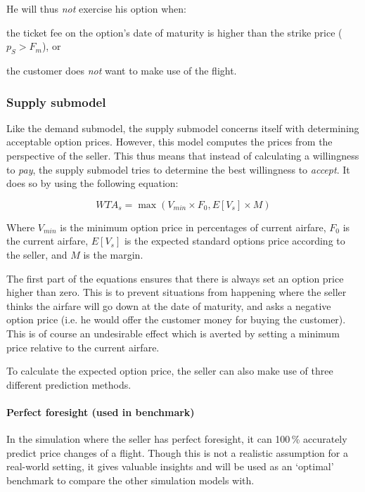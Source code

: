 He will thus \emph{not} exercise his option when:
\begin{compactitem}
    \item the ticket fee on the option's date of maturity is higher than the strike price ($p_S > F_m$), or
    \item the customer does \emph{not} want to make use of the flight.
\end{compactitem}



\subsubsection{Supply submodel}
Like the demand submodel, the supply submodel concerns itself with determining acceptable option prices. However, this model computes the prices from the perspective of the seller. This thus means that instead of calculating a willingness to \emph{pay}, the supply submodel tries to determine the best willingness to \emph{accept}. It does so by using the following equation:

$$ WTA_s = \max(V_{min} \times F_0, E[V_s] \times M) $$

Where $V_{min}$ is the minimum option price in percentages of current airfare, $F_0$ is the current airfare, $E[V_s]$ is the expected standard options price according to the seller, and $M$ is the margin.

The first part of the equations ensures that there is always set an option price higher than zero. This is to prevent situations from happening where the seller thinks the airfare will go down at the date of maturity, and asks a negative option price (i.e. he would offer the customer money for buying the customer). This is of course an undesirable effect which is averted by setting a minimum price relative to the current airfare.

To calculate the expected option price, the seller can also make use of three different prediction methods.

\paragraph{Perfect foresight (used in benchmark)}
In the simulation where the seller has perfect foresight, it can 100\,\% accurately predict price changes of a flight. Though this is not a realistic assumption for a real-world setting, it gives valuable insights and will be used as an `optimal' benchmark to compare the other simulation models with.

